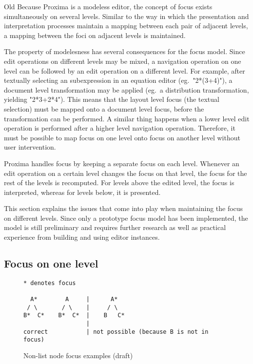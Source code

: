 \bc Old
Because Proxima is a modeless editor, the concept of focus exists simultaneously on several levels.  Similar to the way in which the presentation and interpretation processes maintain a mapping between each pair of adjacent levels, a mapping between the foci on adjacent levels is maintained. 
\ec

The property of modelesness has several consequences for the focus model. Since edit operations on different levels may be mixed, a navigation operation on one level can be followed by an edit operation on a different level. For example, after textually selecting an subexpression in an equation editor (eg.\ "2*(3+4)"), a document level transformation may be applied (eg.\ a distribution transformation, yielding "2*3+2*4"). This means that the layout level focus (the textual selection) must be mapped onto a document level focus, before the transformation can be performed. A similar thing happens when a lower level edit operation is performed after a higher level navigation operation. Therefore, it must be possible to map focus on one level onto focus on another level without user intervention.

Proxima handles focus by keeping a separate focus on each level. Whenever an edit operation on a certain level changes the focus on that level, the focus for the rest of the levels is recomputed. For levels above the edited level, the focus is interpreted, whereas for levels below, it is presented.

This section explains the issues that come into play when maintaining the focus on different levels. Since only a prototype focus model has been implemented, the model is still preliminary and requires further research as well as practical experience from building and using editor instances. 

 
%																
\subsection{Focus on one level}

\begin{figure}
\begin{small}
\begin{center}
\begin{verbatim}
* denotes focus

  A*        A     |      A*
 / \       / \    |     / \
B*  C*    B*  C*  |    B   C*
                  |
correct           | not possible (because B is not in focus)
\end{verbatim}
\caption{Non-list node focus examples (draft)}\label{correctIncorrect focus} 
\end{center}
\end{small}
\end{figure}

